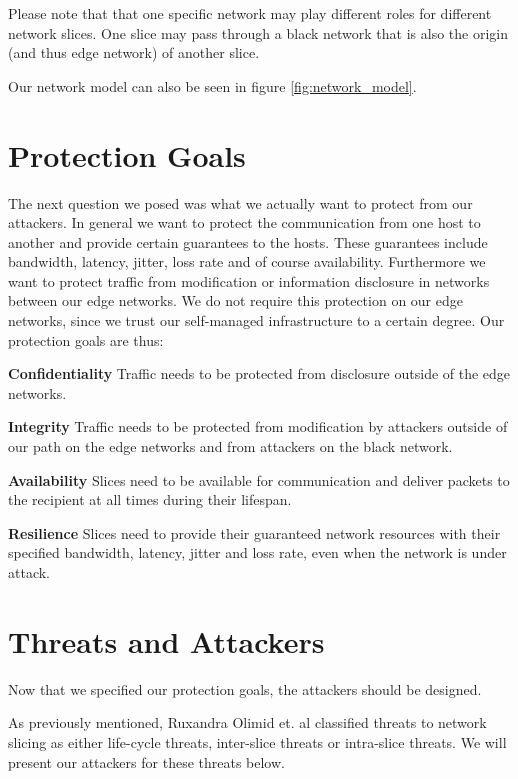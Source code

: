 Please note that that one specific network may play different roles for different network slices. One slice may pass through a black network that is also the origin (and thus edge network) of another slice.

Our network model can also be seen in figure \ref{fig:network_model}.

\section{Protection Goals}
\label{protection_goals}
The next question we posed was what we actually want to protect from our attackers. In general we want to protect the communication from one host to another and provide certain guarantees to the hosts. These guarantees include bandwidth, latency, jitter, loss rate and of course availability. Furthermore we want to protect traffic from modification or information disclosure in networks between our edge networks. We do not require this protection on our edge networks, since we trust our self-managed infrastructure to a certain degree. Our protection goals are thus:
\begin{description}[style=multiline, labelwidth=0.7cm]
    \item[\namedlabel{P1}{P1}] \textbf{Confidentiality} Traffic needs to be protected from disclosure outside of the edge networks.
    \item[\namedlabel{P2}{P2}] \textbf{Integrity} Traffic needs to be protected from modification by attackers outside of our path on the edge networks and from attackers on the black network.
    \item[\namedlabel{P3}{P3}] \textbf{Availability} Slices need to be available for communication and deliver packets to the recipient at all times during their lifespan.
    \item[\namedlabel{P4}{P4}] \textbf{Resilience} Slices need to provide their guaranteed network resources with their specified bandwidth, latency, jitter and loss rate, even when the network is under attack.
\end{description}

\section{Threats and Attackers}
\label{adversaries}
Now that we specified our protection goals, the attackers should be designed.

As previously mentioned, Ruxandra Olimid et. al \cite{SE2} classified threats to network slicing as either life-cycle threats, inter-slice threats or intra-slice threats. We will present our attackers for these threats below.

